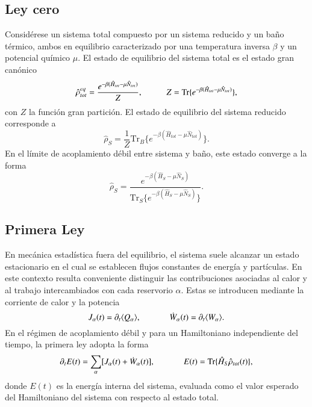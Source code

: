 \subsection{Ley cero}
Considérese un sistema total compuesto por un sistema reducido y un baño térmico, ambos en equilibrio caracterizado por una temperatura inversa $\beta$ y un potencial químico $\mu$. El estado de equilibrio del sistema total es el estado gran canónico
\begin{equation*}
    \hat{\rho}^{eq}_{tot} = \frac{e^{-\beta(\hat{H}_{tot} - \mu \hat{N}_{tot})}}{Z},  
    \hspace{10mm} 
    Z = \text{Tr}\{e^{-\beta(\hat{H}_{tot} - \mu \hat{N}_{tot})} \},
\end{equation*}
con $Z$ la función gran partición. El estado de equilibrio del sistema reducido corresponde a
\begin{equation*}
    \hat{\rho}_{S} = \frac{1}{Z}\text{Tr}_{B}\{ e^{-\beta(\hat{H}_{tot} - \mu \hat{N}_{tot})} \}.
\end{equation*}
En el límite de acoplamiento débil entre sistema y baño, este estado converge a la forma \cite{geva2000second}
\begin{equation*}
    \hat{\rho}_{S} = \frac{e^{-\beta(\hat{H}_{S} - \mu\hat{N}_{S})}}
    {\text{Tr}_{S}\{e^{-\beta(\hat{H}_{S} - \mu \hat{N}_{S})} \} }.
\end{equation*}

\subsection{Primera Ley}
En mecánica estadística fuera del equilibrio, el sistema suele alcanzar un estado estacionario en el cual se establecen flujos constantes de energía y partículas. 
En este contexto resulta conveniente distinguir las contribuciones asociadas al calor y al trabajo intercambiados con cada reservorio $\alpha$. 
Estas se introducen mediante la corriente de calor y la potencia
\begin{equation*}
    J_{\alpha}(t) = \partial_{t}\langle Q_{\alpha}\rangle, 
    \hspace{12mm}  
    \dot{W}_{\alpha}(t) = \partial_{t}\langle W_{\alpha}\rangle.
\end{equation*}
En el régimen de acoplamiento débil y para un Hamiltoniano independiente del tiempo, la primera ley adopta la forma
\begin{equation*}
    \partial_{t}E(t) = \sum_{\alpha}[J_{\alpha}(t) + \dot{W}_{\alpha}(t) ],
    \hspace{12mm}  
    E(t) = \text{Tr}\{\hat{H}_{S}\hat{\rho}_{tot}(t) \},
\end{equation*}
donde $E(t)$ es la energía interna del sistema, evaluada como el valor esperado del Hamiltoniano del sistema con respecto al estado total.

